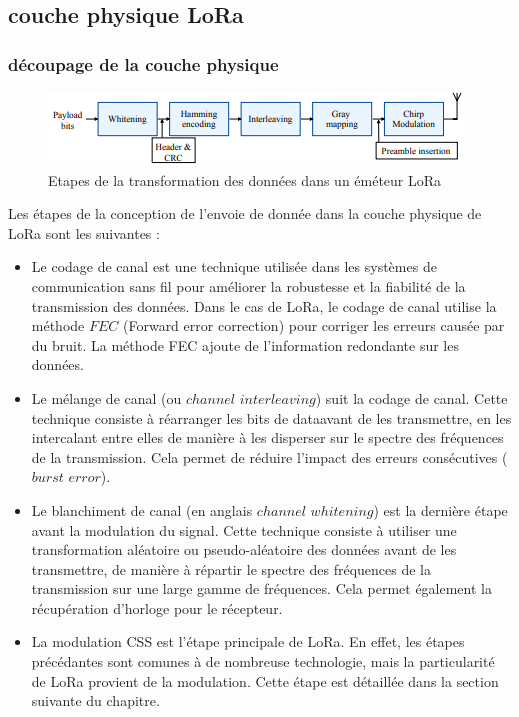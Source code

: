 \documentclass[12pt,a4paper,oneside, titlepage]{report}
\begin{document}
\subsection{couche physique LoRa}

\subsubsection{découpage de la couche physique}

\begin{figure}[h]
\centering

\includegraphics[scale=1]{../images/physical_lora_rx.PNG}
\caption{Etapes de la transformation des données dans un éméteur LoRa}\label{term4}
\end{figure}


Les étapes de la conception de l'envoie de donnée dans la couche physique de LoRa sont les suivantes :
\begin{itemize}
\item Le codage de canal est une technique utilisée dans les systèmes de communication sans fil pour améliorer la robustesse et la fiabilité de la transmission des données. Dans le cas de LoRa, le codage de canal utilise la méthode $FEC$ (Forward error correction) pour corriger les erreurs causée par du bruit. La méthode FEC ajoute de l'information redondante sur les données.
\item Le mélange de canal (ou $channel$ $interleaving$) suit la codage de canal.  
Cette technique consiste à réarranger les bits de dataavant de les transmettre, en les intercalant entre elles de manière à les disperser sur le spectre des fréquences de la transmission. Cela permet de réduire l'impact des erreurs consécutives ($burst$ $error$).
\item Le blanchiment de canal (en anglais $channel$ $whitening$) est la dernière étape avant la modulation du signal.
Cette technique consiste à utiliser une transformation aléatoire ou pseudo-aléatoire des données avant de les transmettre, de manière à répartir le spectre des fréquences de la transmission sur une large gamme de fréquences. Cela permet également la récupération d'horloge pour le récepteur.
\item La modulation CSS est l'étape principale de LoRa. En effet, les étapes précédantes sont comunes à de nombreuse technologie, mais la particularité de LoRa provient de la modulation. Cette étape est détaillée dans la section suivante du chapitre.
\end{itemize}
\end{document}
